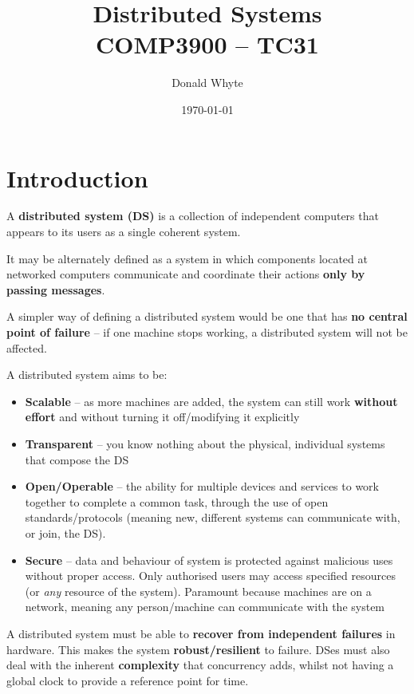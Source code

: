 \documentclass{article}
\title{Distributed Systems \\ COMP3900 -- TC31}
\author{Donald Whyte}
\date{\today}
\begin{document}
\maketitle

\tableofcontents

\pagebreak
\listoffigures

\pagebreak


\section{Introduction}

A \textbf{distributed system (DS)} is a collection of independent computers that appears to its users as a single coherent system. 

It may be alternately defined as a system in which components located at networked computers communicate and coordinate their actions \textbf{only by passing messages}.

A simpler way of defining a distributed system would be one that has \textbf{no central point of failure} -- if one machine stops working, a distributed system will not be affected.

A distributed system aims to be:
\begin{itemize}
	\item \textbf{Scalable} -- as more machines are added, the system can still work \textbf{without effort} and without turning it off/modifying it explicitly
	\item \textbf{Transparent} -- you know nothing about the physical, individual systems that compose the DS
	\item \textbf{Open/Operable} -- the ability for multiple devices and services to work together to complete a common task, through the use of open standards/protocols (meaning new, different systems can communicate with, or join, the DS).
	\item \textbf{Secure} -- data and behaviour of system is protected against malicious uses without proper access. Only authorised users may access specified resources (or \textit{any} resource of the system). Paramount because machines are on a network, meaning any person/machine can communicate with the system
\end{itemize}

A distributed system must be able to \textbf{recover from independent failures} in hardware. This makes the system \textbf{robust/resilient} to failure. DSes must also deal with the inherent \textbf{complexity} that concurrency adds, whilst not having a global clock to provide a reference point for time.
\end{document}
